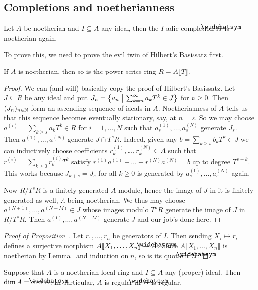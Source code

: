 \documentclass[a4paper,parskip=half,numbers=enddot, DIV=12]{scrreprt}
\renewcommand{\geq}{\geqslant}
\begin{document}
\subsection{Completions and noetherianness}
\begin{prop}
	Let $A$ be noetherian and $I\subseteq A$ any ideal, then the $I$-adic completion $\roof{A}$ is noetherian again.
\end{prop}
To prove this, we need to prove the evil twin of Hilbert's Basissatz first.
\begin{lem}
	If $A$ is noetherian, then so is the power series ring $R=A\llbracket T\rrbracket$.
\end{lem}
\begin{proof}
	We can (and will) basically copy the proof of Hilbert's Basissatz. Let $J\subseteq R$ be any ideal and put $J_n=\left\{a_n\ \middle|\  \sum_{k=n}^\infty a_kT^k\in J\right\}$ for $n\geq 0$. Then $(J_n)_{n\in \mathbb{N}}$ form an ascending sequence of ideals in $A$. Noetherianness of $A$ tells us that this sequence becomes eventually stationary, say, at $n=s$. So we may choose $a^{(i)}=\sum_{k\geq s}a_kT^k\in R$ for $i=1,\ldots,N$ such that $a_s^{(1)},\ldots,a_s^{(N)}$ generate $J_s$. Then $a^{(1)},\ldots,a^{(N)}$ generate $J\cap T^sR$. Indeed, given any $b=\sum_{k\geq s}b_kT^k\in J$ we can inductively choose coefficients $r_k^{(1)},\ldots,r_k^{(N)}\in A$ such that $r^{(i)}=\sum_{k\geq 0}r_k^{(i)}T^k$ satisfy $r^{(1)}a^{(1)}+\ldots+r^{(N)}a^{(N)}=b$ up to degree $T^{s+k}$. This works because $J_{k+s}=J_s$ for all $k\geq 0$ is generated by $a_s^{(1)},\ldots,a_s^{(N)}$ again.
	
	Now $R/T^sR$ is a finitely generated $A$-module, hence the image of $J$ in it is finitely generated as well, $A$ being noetherian. We thus may choose $a^{(N+1)},\ldots,a^{(N+M)}\in J$ whose images modulo $T^sR$ generate the image of $J$ in $R/T^sR$. Then $a^{(1)},\ldots,a^{(N+M)}$ generate $J$ and our job's done here.
\end{proof}
\begin{proof}[Proof of Proposition~]
	Let $r_1,\ldots,r_n$ be generators of $I$. Then sending $X_i\mapsto r_i$ defines a surjective morphism $A\llbracket X_1,\ldots,X_n\rrbracket\epimorphism \roof{A}$. Since $A\llbracket X_1,\ldots,X_n\rrbracket$ is noetherian by Lemma~ and induction on $n$, so is its quotient $\roof{A}$.
\end{proof}
\begin{cor}
	Suppose that $A$ is a noetherian local ring and $I\subseteq A$ any (proper) ideal. Then $\dim A=\dim\roof{A}$. In particular, $A$ is regular iff $\roof{A}$ is regular.
\end{cor}
\end{document}
